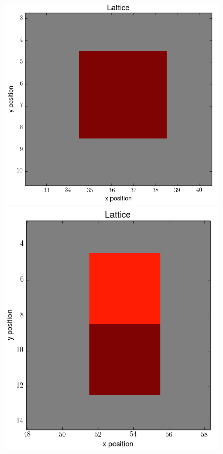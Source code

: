 \documentclass[12pt]{article}
\begin{document}
\begin{figure}[h]
	\centering
	\includegraphics[scale=0.20]{img/1ctc-start}
	\includegraphics[scale=0.20]{img/2vert-start}

\end{figure}
\end{document}
